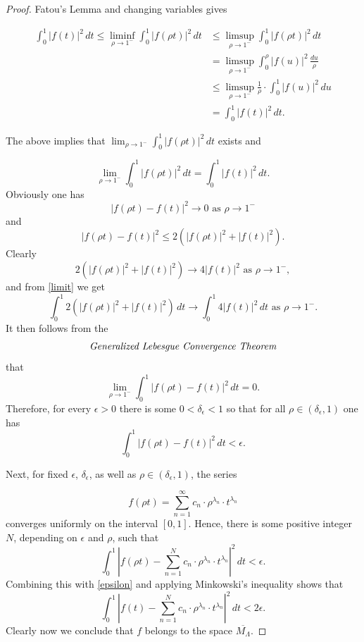 \documentclass[11pt, a4paper]{article}
\begin{document}
\begin{proof}

Fatou's Lemma and changing variables gives

\begin{align*}
\int_{0}^{1}|f(t)|^2\,dt\le \liminf_{\rho\to 1^-}\int_{0}^{1}|f(\rho t)|^2\,dt & \le
\limsup_{\rho\to 1^-}\int_{0}^{1}|f(\rho t)|^2\,dt \\
 & =  \limsup_{\rho\to 1^-}\int_{0}^{\rho}|f(u)|^2\, \frac{du}{\rho}\\ & \le
\limsup_{\rho\to 1^-}\frac{1}{\rho}\cdot \int_{0}^{1}|f(u)|^2\, du \\ & =
\int_{0}^{1}|f(t)|^2\,dt.
\end{align*}

The above implies that $\lim_{\rho\to 1^-}\int_{0}^{1}|f(\rho t)|^2\,dt$ exists and

\begin{equation}\label{limit}
\lim_{\rho\to 1^-}\int_{0}^{1}|f(\rho t)|^2\, dt = \int_{0}^{1}|f(t)|^2\, dt.
\end{equation}
Obviously one has
\[
|f(\rho t)-f(t)|^2\to 0\,\,\text{as}\,\, \rho\to 1^-
\]
and
\[
|f(\rho t)-f(t)|^2\le 2(|f(\rho t)|^2 + |f(t)|^2).
\]
Clearly
\[
2(|f(\rho t)|^2 + |f(t)|^2)\to 4|f(t)|^2\,\,\text{as}\,\, \rho\to 1^-,
\]
and from \eqref{limit} we get
\[
\int_{0}^{1} 2(|f(\rho t)|^2 + |f(t)|^2)\, dt \to \int_{0}^{1} 4|f(t)|^2\, dt \,\,\text{as}\,\, \rho\to 1^-.
\]
It then follows from the
\[
\text{\it{Generalized Lebesgue Convergence Theorem}}
\]
that
\[
\lim_{\rho\to 1^-}\int_{0}^{1}|f(\rho t)-f(t)|^2\, dt = 0.
\]
Therefore, for every $\epsilon>0$ there is some $0<\delta_{\epsilon}<1$ so that for all $\rho\in (\delta_{\epsilon}, 1)$ one has
\begin{equation}\label{epsilon}
\int_{0}^{1}|f(\rho t)-f(t)|^2\, dt < \epsilon.
\end{equation}

Next, for fixed $\epsilon$, $\delta_{\epsilon}$, as well as $\rho \in (\delta_{\epsilon}, 1)$, the series

\[
f(\rho t) = \sum_{n=1}^{\infty} c_{n} \cdot \rho^{\lambda_n}\cdot t^{\lambda_n}
\]
converges uniformly on the interval $[0,1]$. Hence, there is some positive integer $N$, depending on $\epsilon$ and $\rho$, such that
\[
\int_{0}^{1}\left| f(\rho t) - \sum_{n=1}^{N} c_{n} \cdot \rho^{\lambda_n}\cdot t^{\lambda_n}\right|^2\, dt<\epsilon.
\]
Combining this with \eqref{epsilon} and applying Minkowski's inequality shows that
\[
\int_{0}^{1}\left| f(t) - \sum_{n=1}^{N} c_{n} \cdot \rho^{\lambda_n}\cdot t^{\lambda_n}\right|^2\, dt<2\epsilon.
\]
Clearly now we conclude that $f$ belongs to the space $\overline{M_{\Lambda}}$.
\end{proof}
\end{document}

